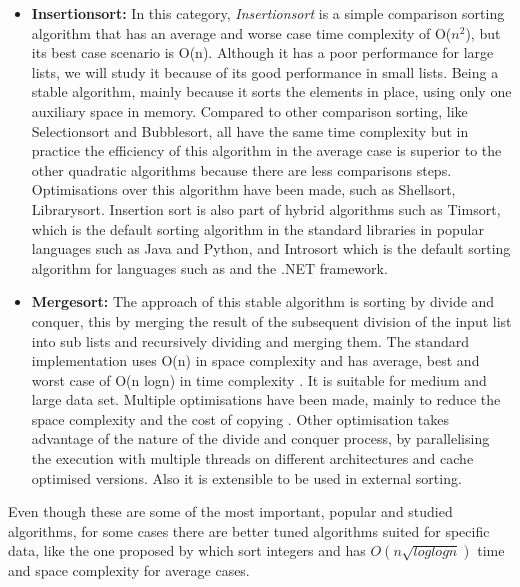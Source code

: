 \documentclass[a4paper,12pt]{article}
\begin{document}
\begin{itemize}
\item {\bf Insertionsort:}  In this category, {\it Insertionsort} is a simple comparison sorting algorithm that has an average and worse case time complexity of O(${n}^2$), but its best case scenario is O(n). Although it has a poor performance for large lists, we will study it because of its good performance in small lists. Being a stable algorithm, mainly because it sorts the elements in place, using only one auxiliary space in memory\cite{knuth1997artInsert}. Compared to other comparison sorting, like Selectionsort and Bubblesort, all have the same time complexity but in practice the efficiency of this algorithm in the average case is superior to the other quadratic algorithms because there are less comparisons steps. Optimisations over this algorithm have been made, such as Shellsort\cite{knuth1997artShell}, Librarysort\cite{bender2006insertion}. Insertion sort is also part of hybrid algorithms such as Timsort\cite{Timsort}, which is the default sorting algorithm in the standard libraries in popular languages such as Java and Python, and  Introsort\cite{musser1997introspective}  which is the default sorting algorithm for languages such as and the .NET framework.

\item {\bf Mergesort:} The approach of this stable algorithm is sorting by divide and conquer, this by merging the result of the subsequent division of the input list into sub lists and recursively dividing and merging them. The standard implementation uses O(n) in space complexity and has average, best and worst case of O(n logn) in time complexity \cite{knuth1997artMerge}. It is suitable for medium and large data set. Multiple optimisations have been made, mainly to reduce the space complexity and the cost of copying \cite{Huang:1988:PIM:42392.42403}.  Other optimisation takes advantage of the nature of the divide and conquer process, by parallelising the execution with multiple threads \cite{chhugani2008efficient} on different architectures and cache optimised versions. Also it is extensible to be used in external sorting.
 \end{itemize}

Even though these are some of the most important, popular and studied algorithms, for some cases there are better tuned algorithms suited for specific data, like the one proposed by \cite{han2002integer}  which sort integers and has {$O(n \sqrt{log log n})$} time and space complexity for average cases.
\end{document}
